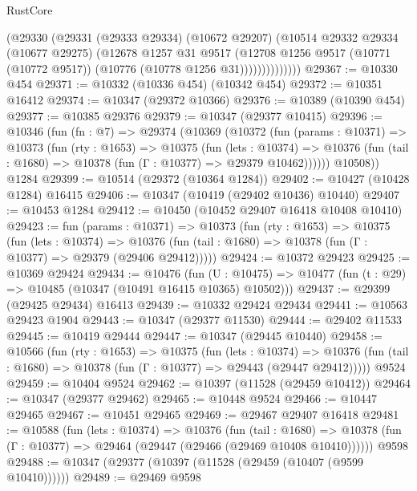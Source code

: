 \begin{lexlean}{RustCore}
\begin{coremodule}
                  (@29330
                    (@29331
                      (@29333 @29334)
                      (@10672 @29207)
                      (@10514
                        @29332
                        @29334
                        (@10677 @29275)
                        (@12678
                          @1257
                          @31
                          @9517
                          (@12708
                            @1256
                            @9517
                            (@10771 (@10772 @9517))
                            (@10776 (@10778 @1256 @31))))))))))))))
@29367 := @10330 @454
@29371 := @10332 (@10336 @454) (@10342 @454)
@29372 := @10351 @16412
@29374 := @10347 (@29372 @10366)
@29376 := @10389 (@10390 @454)
@29377 := @10385 @29376
@29379 := @10347 (@29377 @10415)
@29396 := @10346
    (fun (fn : @7) =>
    @29374
      (@10369
        (@10372
          (fun (params : @10371) =>
          @10373
            (fun (rty : @1653) =>
            @10375
              (fun (lets : @10374) =>
              @10376 (fun (tail : @1680) => @10378 (fun (Γ : @10377) => @29379 @10462))))))
        @10508))
    @1284
@29399 := @10514 (@29372 (@10364 @1284))
@29402 := @10427 (@10428 @1284) @16415
@29406 := @10347 (@10419 (@29402 @10436) @10440)
@29407 := @10453 @1284
@29412 := @10450 (@10452 @29407 @16418 @10408 @10410)
@29423 := fun (params : @10371) =>
  @10373
    (fun (rty : @1653) =>
    @10375
      (fun (lets : @10374) =>
      @10376 (fun (tail : @1680) => @10378 (fun (Γ : @10377) => @29379 (@29406 @29412)))))
@29424 := @10372 @29423
@29425 := @10369 @29424
@29434 := @10476
    (fun (U : @10475) => @10477 (fun (t : @29) => @10485 (@10347 (@10491 @16415 @10365) @10502)))
@29437 := @29399 (@29425 @29434) @16413
@29439 := @10332 @29424 @29434
@29441 := @10563 @29423 @1904
@29443 := @10347 (@29377 @11530)
@29444 := @29402 @11533
@29445 := @10419 @29444
@29447 := @10347 (@29445 @10440)
@29458 := @10566
    (fun (rty : @1653) =>
    @10375
      (fun (lets : @10374) =>
      @10376 (fun (tail : @1680) => @10378 (fun (Γ : @10377) => @29443 (@29447 @29412)))))
    @9524
@29459 := @10404 @9524
@29462 := @10397 (@11528 (@29459 @10412))
@29464 := @10347 (@29377 @29462)
@29465 := @10448 @9524
@29466 := @10447 @29465
@29467 := @10451 @29465
@29469 := @29467 @29407 @16418
@29481 := @10588
    (fun (lets : @10374) =>
    @10376
      (fun (tail : @1680) =>
      @10378 (fun (Γ : @10377) => @29464 (@29447 (@29466 (@29469 @10408 @10410))))))
    @9598
@29488 := @10347 (@29377 (@10397 (@11528 (@29459 (@10407 (@9599 @10410))))))
@29489 := @29469 @9598

\end{coremodule}
\end{lexlean}
